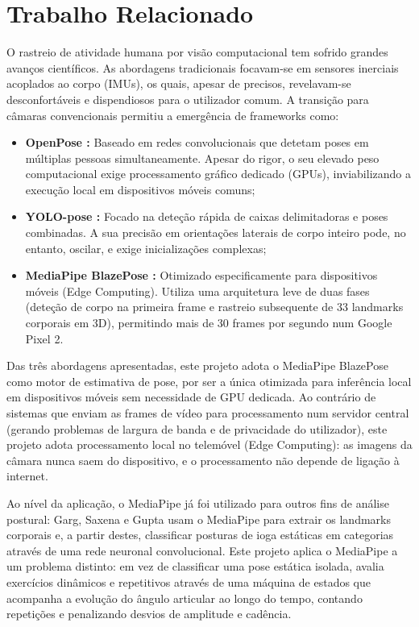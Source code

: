\chapter{Trabalho Relacionado}
\label{ch:trabalhoRelacionado}

O rastreio de atividade humana por visão computacional tem sofrido grandes avanços científicos. As abordagens tradicionais focavam-se em sensores inerciais acoplados ao corpo (IMUs), os quais, apesar de precisos, revelavam-se desconfortáveis e dispendiosos para o utilizador comum. A transição para câmaras convencionais permitiu a emergência de frameworks como:

\begin{itemize}
    \item \textbf{OpenPose \cite{Cao_OpenPose_2019}:} Baseado em redes convolucionais que detetam poses em múltiplas pessoas simultaneamente. Apesar do rigor, o seu elevado peso computacional exige processamento gráfico dedicado (GPUs), inviabilizando a execução local em dispositivos móveis comuns;
    \item \textbf{YOLO-pose \cite{Maji_YOLOPose_2022}:} Focado na deteção rápida de caixas delimitadoras e poses combinadas. A sua precisão em orientações laterais de corpo inteiro pode, no entanto, oscilar, e exige inicializações complexas;
    \item \textbf{MediaPipe BlazePose \cite{Bazarevsky_BlazePose_2020}:} Otimizado especificamente para dispositivos móveis (Edge Computing). Utiliza uma arquitetura leve de duas fases (deteção de corpo na primeira frame e rastreio subsequente de 33 landmarks corporais em 3D), permitindo mais de 30 frames por segundo num Google Pixel 2.
\end{itemize}

Das três abordagens apresentadas, este projeto adota o MediaPipe BlazePose como motor de estimativa de pose, por ser a única otimizada para inferência local em dispositivos móveis sem necessidade de GPU dedicada. Ao contrário de sistemas que enviam as frames de vídeo para processamento num servidor central (gerando problemas de largura de banda e de privacidade do utilizador), este projeto adota processamento local no telemóvel (Edge Computing): as imagens da câmara nunca saem do dispositivo, e o processamento não depende de ligação à internet.

Ao nível da aplicação, o MediaPipe já foi utilizado para outros fins de análise postural: Garg, Saxena e Gupta \cite{Garg_YogaMediaPipe_2023} usam o MediaPipe para extrair os landmarks corporais e, a partir destes, classificar posturas de ioga estáticas em categorias através de uma rede neuronal convolucional. Este projeto aplica o MediaPipe a um problema distinto: em vez de classificar uma pose estática isolada, avalia exercícios dinâmicos e repetitivos através de uma máquina de estados que acompanha a evolução do ângulo articular ao longo do tempo, contando repetições e penalizando desvios de amplitude e cadência.

